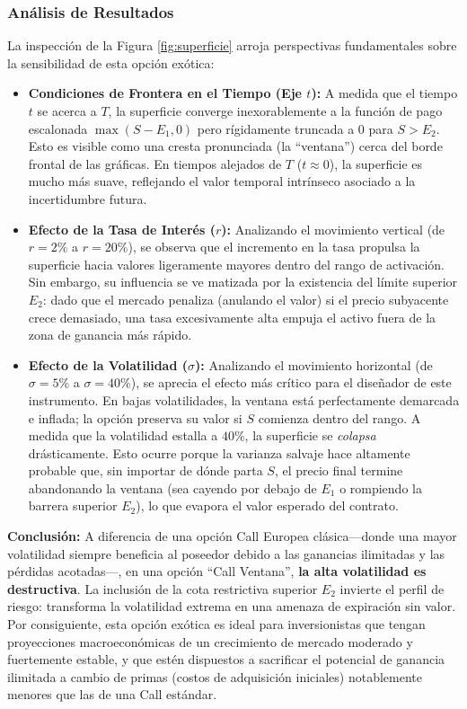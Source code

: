 \documentclass[12pt]{article}
\begin{document}
\subsubsection{Análisis de Resultados}

La inspección de la Figura \ref{fig:superficie} arroja perspectivas fundamentales sobre la sensibilidad de esta opción exótica:

\begin{itemize}
    \item \textbf{Condiciones de Frontera en el Tiempo (Eje $t$):} A medida que el tiempo $t$ se acerca a $T$, la superficie converge inexorablemente a la función de pago escalonada $\max(S-E_1, 0)$ pero rígidamente truncada a 0 para $S > E_2$. Esto es visible como una cresta pronunciada (la ``ventana'') cerca del borde frontal de las gráficas. En tiempos alejados de $T$ ($t \approx 0$), la superficie es mucho más suave, reflejando el valor temporal intrínseco asociado a la incertidumbre futura.
    \item \textbf{Efecto de la Tasa de Interés ($r$):} Analizando el movimiento vertical (de $r=2\%$ a $r=20\%$), se observa que el incremento en la tasa propulsa la superficie hacia valores ligeramente mayores dentro del rango de activación. Sin embargo, su influencia se ve matizada por la existencia del límite superior $E_2$: dado que el mercado penaliza (anulando el valor) si el precio subyacente crece demasiado, una tasa excesivamente alta empuja el activo fuera de la zona de ganancia más rápido.
    \item \textbf{Efecto de la Volatilidad ($\sigma$):} Analizando el movimiento horizontal (de $\sigma=5\%$ a $\sigma=40\%$), se aprecia el efecto más crítico para el diseñador de este instrumento. En bajas volatilidades, la ventana está perfectamente demarcada e inflada; la opción preserva su valor si $S$ comienza dentro del rango. A medida que la volatilidad estalla a $40\%$, la superficie se \textit{colapsa} drásticamente. Esto ocurre porque la varianza salvaje hace altamente probable que, sin importar de dónde parta $S$, el precio final termine abandonando la ventana (sea cayendo por debajo de $E_1$ o rompiendo la barrera superior $E_2$), lo que evapora el valor esperado del contrato.
\end{itemize}

\textbf{Conclusión:} A diferencia de una opción Call Europea clásica---donde una mayor volatilidad siempre beneficia al poseedor debido a las ganancias ilimitadas y las pérdidas acotadas---, en una opción ``Call Ventana'', \textbf{la alta volatilidad es destructiva}. La inclusión de la cota restrictiva superior $E_2$ invierte el perfil de riesgo: transforma la volatilidad extrema en una amenaza de expiración sin valor. Por consiguiente, esta opción exótica es ideal para inversionistas que tengan proyecciones macroeconómicas de un crecimiento de mercado moderado y fuertemente estable, y que estén dispuestos a sacrificar el potencial de ganancia ilimitada a cambio de primas (costos de adquisición iniciales) notablemente menores que las de una Call estándar.
\end{document}
